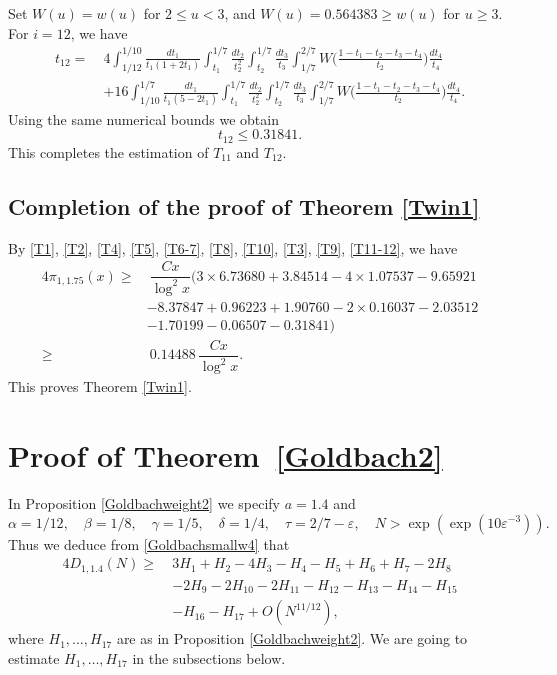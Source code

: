 \documentclass[12pt, a4paper]{amsart}
\def\geq{\geqslant}
\def\le{\leqslant}
\def\ge{\geqslant}
\theoremstyle{plain}
\theoremstyle{remark}
\numberwithin{equation}{section}
\begin{document}
Set $W(u)=w(u)$ for $2\le u<3$, and $W(u)=0.564383\ge w(u)$ for $u\ge 3$.
For $i=12$, we have
\begin{equation*}
\begin{aligned}
t_{12}
= \ &4\int_{1/12}^{1/10}\frac{dt_1}{t_1(1+2t_1)}\int_{t_1}^{1/7}\frac{dt_2}{t_2^2}\int_{t_2}^{1/7}\frac{dt_3}{t_3}\int_{1/7}^{2/7} W\bigg(\frac{1-t_1-t_2-t_3-t_4}{t_2}\bigg)\frac{dt_4}{t_4}\\
&+16\int_{1/10}^{1/7}\frac{dt_1}{t_1(5-2t_1)}\int_{t_1}^{1/7}\frac{dt_2}{t_2^2}\int_{t_2}^{1/7}\frac{dt_3}{t_3}\int_{1/7}^{2/7} W\bigg(\frac{1-t_1-t_2-t_3-t_4}{t_2}\bigg)\frac{dt_4}{t_4}. 
\end{aligned}
\end{equation*}
Using the same numerical bounds we obtain
\begin{equation}\label{t12}
t_{12} \le 0.31841.
\end{equation}
This completes the estimation of $T_{11}$ and $T_{12}$.

\subsection{Completion of the proof of Theorem \ref{Twin1}} 
By \eqref{T1}, \eqref{T2}, \eqref{T4}, \eqref{T5}, \eqref{T6-7}, \eqref{T8}, \eqref{T10}, \eqref{T3}, \eqref{T9}, \eqref{T11-12}, we have
\begin{equation}
\begin{split}
4\pi_{1,1.75}(x)
\ge &\ \dfrac{Cx}{\log^2 x} (3\times 6.73680 + 3.84514 - 4\times 1.07537 - 9.65921  \\
& - 8.37847 + 0.96223 + 1.90760 - 2\times 0.16037 -2.03512 \\
& - 1.70199  - 0.06507 - 0.31841) \\ 
\ge &\ 0.14488\,\dfrac{Cx}{\log^2 x}.
\end{split}
\end{equation}
This proves Theorem \ref{Twin1}. 	
	
\section{Proof of Theorem~\ref{Goldbach2}}\label{sec7}

In Proposition \ref{Goldbachweight2} we specify $a=1.4$ and 
\begin{equation}\label{Cond/Goldsmall}
\alpha=1/12,\quad \beta=1/8,\quad \gamma=1/5,\quad \delta=1/4,\quad \tau=2/7-\varepsilon,\quad N>\exp(\exp(10\varepsilon^{-3})).
\end{equation} 
Thus we deduce from \eqref{Goldbachsmallw4} that 
\begin{equation*}
		\begin{split}
		4D_{1, 1.4}(N) \geq\ & 3H_1 + H_2 -4H_3- H_4- H_5 + H_6 + H_7- 2H_8 \\
		& - 2H_9 -2H_{10}- 2H_{11} - H_{12} - H_{13}-H_{14}-H_{15} \\ 
		& -H_{16}-H_{17} + O(N^{11/12}), 
		\end{split}
\end{equation*}
where $H_1, \ldots, H_{17}$ are as in Proposition \ref{Goldbachweight2}. We are going to estimate $H_1, \ldots, H_{17}$ 
in the subsections below.
\end{document}
